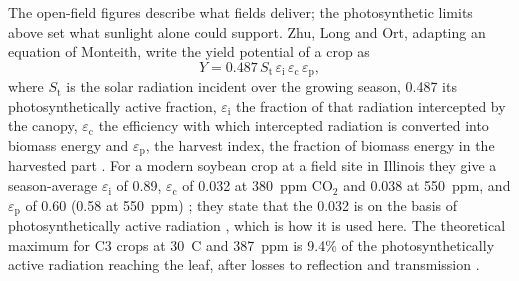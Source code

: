 The open-field figures describe what fields deliver; the photosynthetic limits above set what sunlight alone could support. Zhu, Long and Ort, adapting an equation of Monteith, write the yield potential of a crop as
\begin{equation}
Y = 0.487\,S_{\mathrm{t}}\,\varepsilon_{\mathrm{i}}\,\varepsilon_{\mathrm{c}}\,\varepsilon_{\mathrm{p}},
\end{equation}
where $S_{\mathrm{t}}$ is the solar radiation incident over the growing season, 0.487 its photosynthetically active fraction, $\varepsilon_{\mathrm{i}}$ the fraction of that radiation intercepted by the canopy, $\varepsilon_{\mathrm{c}}$ the efficiency with which intercepted radiation is converted into biomass energy and $\varepsilon_{\mathrm{p}}$, the harvest index, the fraction of biomass energy in the harvested part \cite[Eq.~1, p.~238]{zhu2010photosynthesis}. For a modern soybean crop at a field site in Illinois they give a season-average $\varepsilon_{\mathrm{i}}$ of 0.89, $\varepsilon_{\mathrm{c}}$ of 0.032 at 380~ppm CO$_2$ and 0.038 at 550~ppm, and $\varepsilon_{\mathrm{p}}$ of 0.60 (0.58 at 550~ppm) \cite[Table~1, p.~239]{zhu2010photosynthesis}; they state that the 0.032 is on the basis of photosynthetically active radiation \cite[p.~240]{zhu2010photosynthesis}, which is how it is used here.%
 The theoretical maximum for C3 crops at 30~\textdegree{}C and 387~ppm is 9.4\% of the photosynthetically active radiation reaching the leaf, after losses to reflection and transmission \cite[pp.~240, 242; Fig.~2, p.~240]{zhu2010photosynthesis}.

